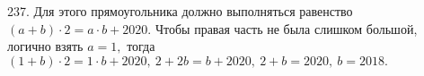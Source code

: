 237. Для этого прямоугольника должно выполняться равенство $(a+b)\cdot2=a\cdot b+2020.$ Чтобы правая часть не была слишком большой, логично взять $a=1,$ тогда
$(1+b)\cdot 2=1\cdot b+2020,\ 2+2b=b+2020,\ 2+b=2020,\ b=2018.$\\
